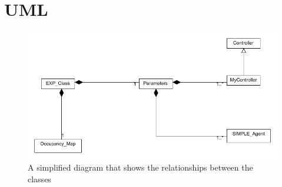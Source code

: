 \section{UML}
\label{appendixB:uml}

\begin{figure}[h]
\centering
\includegraphics[scale=0.6]{Chapter2/images/uml_simple.png}
\caption{A simplified diagram that shows the relationships between the classes}
\label{fig:simple_uml}
\end{figure}



